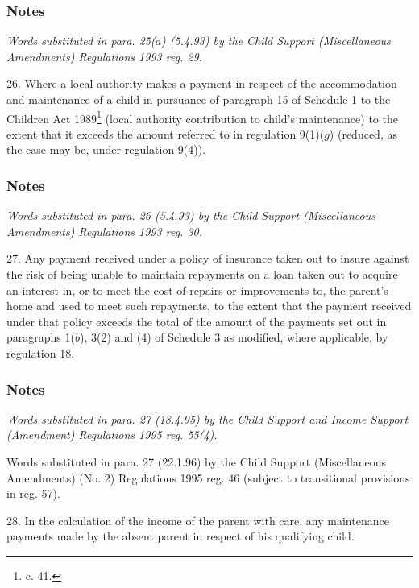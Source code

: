 \documentclass[a4paper]{article}
\newcommand\amendment[1]{\subsubsection*{Notes}{\itshape\frenchspacing\footnotesize #1 \par\goodbreak}}
\begin{document}
\amendment{
Words substituted in para. 25($a$) (5.4.93) by the Child Support (Miscellaneous Amendments) Regulations 1993 reg. 29.
}

\medskip

26.  Where a local authority makes a payment in respect of the accommodation and maintenance of a child in pursuance of paragraph 15 of Schedule 1 to the Children Act 1989\footnote{ c. 41.} (local authority contribution to child’s maintenance) to the extent that it exceeds the amount referred to in 
regulation 9(1)($g$) %
(reduced, as the case may be, under regulation 9(4)).

\amendment{
Words substituted in para. 26 (5.4.93) by the Child Support (Miscellaneous Amendments) Regulations 1993 reg. 30.
}

\medskip

27.  Any payment received under a policy of insurance taken out to insure against the risk of being unable to maintain repayments on a loan taken out to acquire an interest in, or to meet the cost of repairs or improvements to, the parent’s home and used to meet such repayments, to the extent that the payment received under that policy 
exceeds  %
%
%
the total of the amount of the payments set out in paragraphs 1($b$), 3(2) and (4) of Schedule 3 as modified, where applicable, by regulation 18.  %

\amendment{
Words substituted in para. 27 (18.4.95) by the Child Support and Income Support (Amendment) Regulations 1995 reg. 55(4).

Words substituted in para. 27 (22.1.96) by the Child Support (Miscellaneous Amendments) (No. 2) Regulations 1995 reg. 46 (subject to transitional provisions in reg. 57).
}

\medskip

28.  In the calculation of the income of the parent with care, any maintenance payments made by the absent parent in respect of his qualifying child.

\medskip
\end{document}
